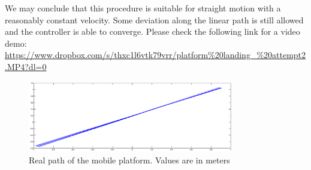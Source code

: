 \noindent
We may conclude that this procedure is suitable for straight motion with a reasonably constant velocity. Some deviation along the linear path is still allowed and the controller is able to converge. Please check the following link for a video demo: \url{https://www.dropbox.com/s/thxc1l6vtk79vrr/platform%20landing_%20attempt2.MP4?dl=0}


\begin{figure}[h]
    \centering
      \includegraphics[width = 0.8\textwidth]{platform.eps}
       \caption{Real path of the mobile platform. Values are in meters }
      \label{figure:path}
\end{figure}
